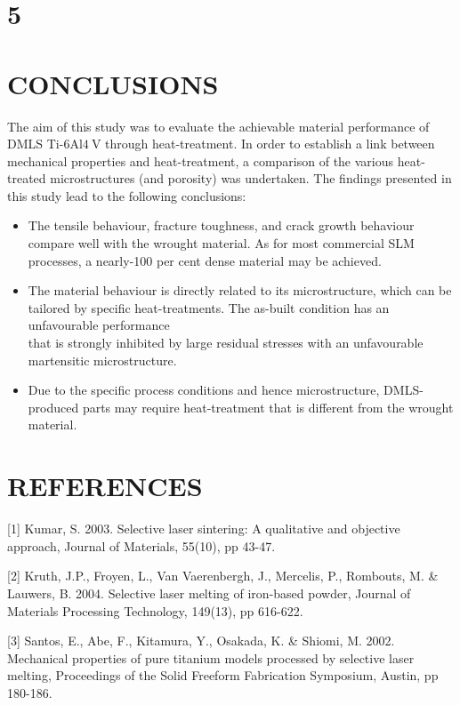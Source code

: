 \documentclass[10pt]{article}
\begin{document}
\section*{5}
\section*{CONCLUSIONS}
The aim of this study was to evaluate the achievable material performance of DMLS Ti-6Al$4 \mathrm{~V}$ through heat-treatment. In order to establish a link between mechanical properties and heat-treatment, a comparison of the various heat-treated microstructures (and porosity) was undertaken. The findings presented in this study lead to the following conclusions:

\begin{itemize}
  \item The tensile behaviour, fracture toughness, and crack growth behaviour compare well with the wrought material. As for most commercial SLM processes, a nearly-100 per cent dense material may be achieved.

  \item The material behaviour is directly related to its microstructure, which can be tailored by specific heat-treatments. The as-built condition has an unfavourable performance\\
that is strongly inhibited by large residual stresses with an unfavourable martensitic microstructure.

  \item Due to the specific process conditions and hence microstructure, DMLS-produced parts may require heat-treatment that is different from the wrought material.

\end{itemize}

\section*{REFERENCES}
[1] Kumar, S. 2003. Selective laser sintering: A qualitative and objective approach, Journal of Materials, 55(10), pp 43-47.

[2] Kruth, J.P., Froyen, L., Van Vaerenbergh, J., Mercelis, P., Rombouts, M. \& Lauwers, B. 2004. Selective laser melting of iron-based powder, Journal of Materials Processing Technology, 149(13), pp 616-622.

[3] Santos, E., Abe, F., Kitamura, Y., Osakada, K. \& Shiomi, M. 2002. Mechanical properties of pure titanium models processed by selective laser melting, Proceedings of the Solid Freeform Fabrication Symposium, Austin, pp 180-186.
\end{document}
